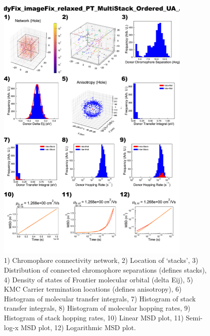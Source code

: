 \documentclass[12pt]{article}
\begin{document}
\begin{figure}[h]\centering
	\includegraphics[width=0.85\textwidth]{Figures/PT_MultiStack_Ordered.png}
    \caption{   1) Chromophore connectivity network, 
                2) Location of `stacks', 
                3) Distribution of connected chromophore separations (defines stacks),
                4) Density of states of Frontier molecular orbital (delta Eij),
                5) KMC Carrier termination locations (defines anisotropy),
                6) Histogram of molecular transfer integrals,
                7) Histogram of stack transfer integrals,
                8) Histogram of molecular hopping rates,
                9) Histogram of stack hopping rates,
                10) Linear MSD plot,
                11) Semi-log-x MSD plot,
                12) Logarithmic MSD plot.}
	\label{fig:PTMultOrd}
\end{figure}
\end{document}
